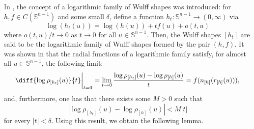 \documentclass[11pt]{amsart}
\theoremstyle{definition}
\theoremstyle{remark}
\numberwithin{equation}{section}
\newcommand{\s}{\mathbb{S}}
\begin{document}
	In \cite{HLYZ16}, the concept of a logarithmic family of Wulff shapes was introduced: for $h,f\in C(\s^{n-1})$ and some small $\delta$, define a function $h_t:\s^{n-1}\to (0,\infty)$ via
	\begin{equation}
	    \log(h_t(u))=\log(h(u)) +tf(u) + o(t,u)
	    \label{eq:log_fam}
	\end{equation}
	where $o(t,u)/t \rightarrow 0$ as $t\to 0$ for all $u\in\s^{n-1}.$ Then, the Wulff shapes $[h_t]$ are said to be the logarithmic family of Wulff shapes formed by the pair $(h,f).$ It was shown in \cite[Lemma 4.3]{HLYZ16} that the radial functions of a logarithmic family satisfy, for almost all $u\in\s^{n-1}$, the following limit:
	$$\diff{\log\rho_{[h_t]}(u)}{t}\bigg|_{t=0}=\lim_{t\to 0}\frac{\log\rho_{[h_t]}(u)-\log\rho_{[h]}(u)}{t}=f(n_{[h]}(r_{[h]}(u))),$$
	and, furthermore, one has that there exists some $M>0$ such that $$|\log\rho_{[h_t]}(u)-\log\rho_{[h]}(u)|<M|t|$$ for every $|t| <\delta.$
	Using this result, we obtain the following lemma.
	
\end{document}
